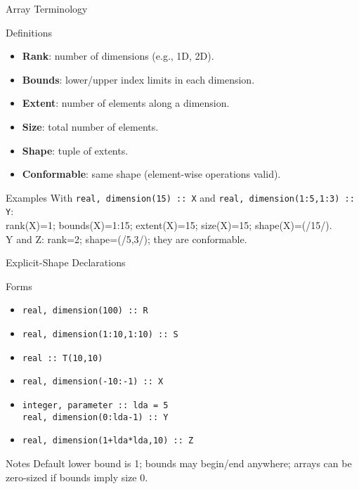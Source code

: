 \begin{frame}{Array Terminology}
  \begin{block}{Definitions}
    \begin{itemize}
      \item \textbf{Rank}: number of dimensions (e.g., 1D, 2D).
      \item \textbf{Bounds}: lower/upper index limits in each dimension.
      \item \textbf{Extent}: number of elements along a dimension.
      \item \textbf{Size}: total number of elements.
      \item \textbf{Shape}: tuple of extents.
      \item \textbf{Conformable}: same shape (element-wise operations valid).
    \end{itemize}
  \end{block}
  \begin{block}{Examples}
    With \texttt{real, dimension(15) :: X} and \texttt{real, dimension(1:5,1:3) :: Y}:\\
    rank(X)=1; bounds(X)=1:15; extent(X)=15; size(X)=15; shape(X)=(/15/).\\
    Y and Z: rank=2; shape=(/5,3/); they are conformable.
  \end{block}
\end{frame}


\begin{frame}{Explicit-Shape Declarations}
  \begin{block}{Forms}
    \begin{itemize}
      \item \texttt{real, dimension(100) :: R}
      \item \texttt{real, dimension(1:10,1:10) :: S}
      \item \texttt{real :: T(10,10)}
      \item \texttt{real, dimension(-10:-1) :: X}
      \item \texttt{integer, parameter :: lda = 5}\\
            \texttt{real, dimension(0:lda-1) :: Y}
      \item \texttt{real, dimension(1+lda*lda,10) :: Z}
    \end{itemize}
  \end{block}
  \begin{block}{Notes}
    Default lower bound is 1; bounds may begin/end anywhere; arrays can be zero-sized if bounds imply size 0.
  \end{block}
\end{frame}

